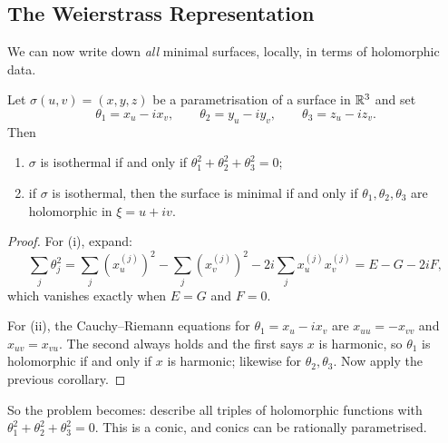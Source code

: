 \documentclass[a4paper]{scrartcl}
\begin{document}
\subsection{The Weierstrass Representation}

We can now write down \emph{all} minimal surfaces, locally, in terms of holomorphic data.

\begin{proposition}
    Let $\sigma(u,v) = (x, y, z)$ be a parametrisation of a surface in $\mathbb{R}^3$ and set
    $$
    \theta_1 = x_u - i x_v, \qquad \theta_2 = y_u - iy_v, \qquad \theta_3 = z_u - iz_v.
    $$
    Then
    \begin{enumerate}[label=(\roman*)]
        \item $\sigma$ is isothermal if and only if $\theta_1^2+\theta_2^2+\theta_3^2 = 0$;
        \item if $\sigma$ is isothermal, then the surface is minimal if and only if $\theta_1,\theta_2,\theta_3$ are holomorphic in $\xi = u + iv$.
    \end{enumerate}
\end{proposition}
\begin{proof}
    For (i), expand:
    $$
    \sum_j\theta_j^2 = \sum_j\left(x^{(j)}_u\right)^2 - \sum_j\left(x^{(j)}_v\right)^2 - 2i\sum_j x^{(j)}_ux^{(j)}_v = E - G - 2iF,
    $$
    which vanishes exactly when $E = G$ and $F = 0$.

    For (ii), the Cauchy--Riemann equations for $\theta_1 = x_u - ix_v$ are $x_{uu} = -x_{vv}$ and $x_{uv} = x_{vu}$. The second always holds and the first says $x$ is harmonic, so $\theta_1$ is holomorphic if and only if $x$ is harmonic; likewise for $\theta_2,\theta_3$. Now apply the previous corollary.
\end{proof}

So the problem becomes: describe all triples of holomorphic functions with $\theta_1^2+\theta_2^2+\theta_3^2=0$. This is a conic, and conics can be rationally parametrised.
\end{document}
